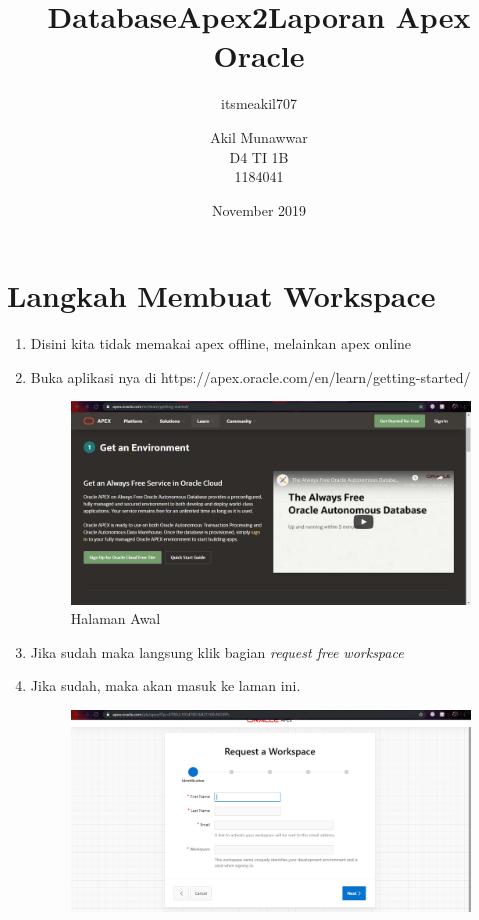 \documentclass{article}
\title{DatabaseApex2}
\author{itsmeakil707 }
\date{November 2019}
\begin{document}
\title{Laporan Apex Oracle}
\author{Akil Munawwar \\ D4 TI 1B \\ 1184041}
\maketitle

\section{Langkah Membuat Workspace}
\begin{enumerate}
    \item Disini kita tidak memakai apex offline, melainkan apex online
    \item Buka aplikasi nya di https://apex.oracle.com/en/learn/getting-started/
    \begin{figure}[!htbp]
        \centering
        \includegraphics[scale=0.3]{figure/1.PNG}
        \caption{Halaman Awal}
    \end{figure}
    \item Jika sudah maka langsung klik bagian \textit{request free workspace}
\newpage
    \item Jika sudah, maka akan masuk ke laman ini.
    \begin{figure}[!htbp]
        \centering
        \includegraphics[scale=0.3]{figure/2.PNG}

\end{figure}
\end{enumerate}
\end{document}
